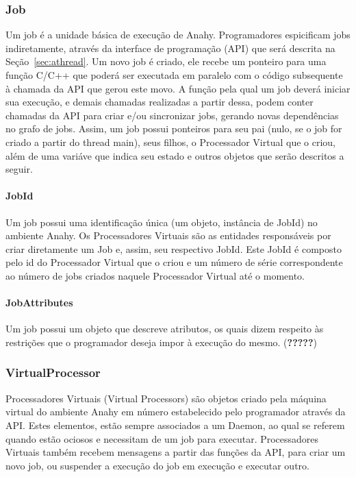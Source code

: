 \documentclass[12pt]{article}
\begin{document}
\subsubsection{Job}

Um job é a unidade básica de execução de Anahy. Programadores espicificam jobs indiretamente, através da interface de programação (API) que será descrita na Seção~\ref{sec:athread}. Um novo job é criado, ele recebe um ponteiro para uma função C/C++ que poderá ser executada em paralelo com o código subsequente à chamada da API que gerou este movo. A função pela qual um job deverá iniciar sua execução, e demais chamadas realizadas a partir dessa, podem conter chamadas da API para criar e/ou sincronizar jobs, gerando novas dependências no grafo de jobs. Assim, um job possui ponteiros para seu pai (nulo, se o job for criado a partir do thread main), seus filhos, o Processador Virtual que o criou, além de uma variáve que indica seu estado e outros objetos que serão descritos a seguir.

\paragraph{JobId}

Um job possui uma identificação única (um objeto, instância de JobId) no ambiente Anahy. Os Processadores Virtuais são as entidades responsáveis por criar diretamente um Job e, assim, seu respectivo JobId. Este JobId é composto pelo id do Processador Virtual que o criou e um número de série correspondente ao número de jobs criados naquele Processador Virtual até o momento.

\paragraph{JobAttributes}

Um job possui um objeto que descreve atributos, os quais dizem respeito às restrições que o programador deseja impor à execução do mesmo. (\textbf{?????})

\subsubsection{VirtualProcessor}

Processadores Virtuais (Virtual Processors) são objetos criado pela máquina virtual do ambiente Anahy em número estabelecido pelo programador através da API. Estes elementos, estão sempre associados a um Daemon, ao qual se referem quando estão ociosos e necessitam de um job para executar. Processadores Virtuais também recebem mensagens a partir das funções da API, para criar um novo job, ou suspender a execução do job em execução e executar outro.
\end{document}
